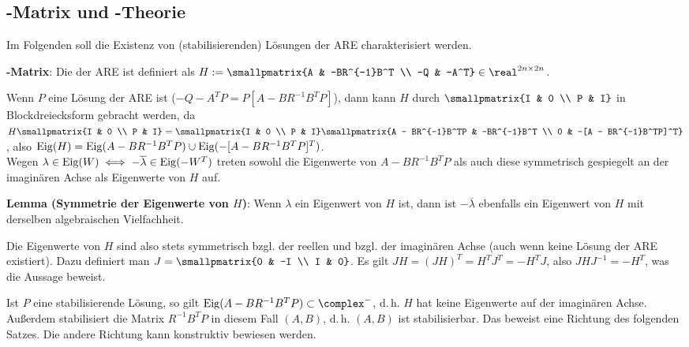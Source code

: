 \pagebreak

\subsection{%
    -Matrix und -Theorie%
}

Im Folgenden soll die Existenz von (stabilisierenden) Lösungen der ARE charakterisiert werden.

\textbf{-Matrix}:
Die  der ARE ist definiert als
$H := \smallpmatrix{A & -BR^{-1}B^T \\ -Q & -A^T} \in \real^{2n \times 2n}$.

Wenn $P$ eine Lösung der ARE ist ($-Q - A^T P = P[A - BR^{-1}B^T P]$),
dann kann $H$ durch $\smallpmatrix{I & 0 \\ P & I}$ in Blockdreiecksform gebracht werden,
da $H \smallpmatrix{I & 0 \\ P & I}
= \smallpmatrix{I & 0 \\ P & I}
\smallpmatrix{A - BR^{-1}B^TP & -BR^{-1}B^T \\ 0 & -[A - BR^{-1}B^TP]^T}$,
also $\operatorname{Eig}(H) = \operatorname{Eig}(A - BR^{-1}B^TP) \cup \operatorname{Eig}(-[A - BR^{-1}B^TP]^T)$.\\
Wegen $\lambda \in \operatorname{Eig}(W) \iff -\overline{\lambda} \in \operatorname{Eig}(-W^T)$ treten
sowohl die Eigenwerte von $A - BR^{-1}B^TP$ als auch
diese symmetrisch gespiegelt an der imaginären Achse
als Eigenwerte von $H$ auf.

\textbf{Lemma (Symmetrie der Eigenwerte von $H$)}:
Wenn $\lambda$ ein Eigenwert von $H$ ist,
dann ist $-\overline{\lambda}$ ebenfalls ein Eigenwert von $H$ mit derselben
algebraischen Vielfachheit.

Die Eigenwerte von $H$ sind also stets symmetrisch bzgl. der reellen und bzgl. der imaginären Achse
(auch wenn keine Lösung der ARE existiert).
Dazu definiert man $J = \smallpmatrix{0 & -I \\ I & 0}$.
Es gilt $JH = (JH)^T = H^T J^T = -H^T J$, also $JHJ^{-1} = -H^T$,
was die Aussage beweist.

\linie

Ist $P$ eine stabilisierende Lösung, so gilt
$\Eig(A - BR^{-1}B^TP) \subset \complex^-$, d.\,h. $H$ hat keine Eigenwerte auf der imaginären
Achse.
Außerdem stabilisiert die Matrix $R^{-1} B^T P$ in diesem Fall $(A, B)$,
d.\,h. $(A, B)$ ist stabilisierbar.
Das beweist eine Richtung des folgenden Satzes.
Die andere Richtung kann konstruktiv bewiesen werden.

